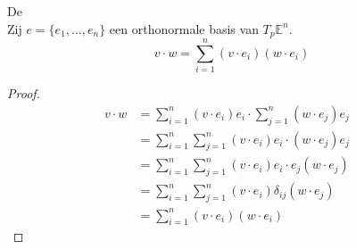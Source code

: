 \documentclass[main.tex]{subfiles}
\begin{document}
\begin{gev}
  \label{gev:identiteit-van-parseval}
  De \\
  Zij $e = \{e_{1},\dotsc,e_{n}\}$ een orthonormale basis van $T_{p}\mathbb{E}^{n}$. 
  \[ v \cdot w = \sum_{i=1}^{n}(v \cdot e_{i})(w \cdot e_{i})\]

  \begin{proof}
    \[
    \begin{array}{rll}

      v \cdot w &= \sum_{i=1}^{n} (v \cdot e_{i})e_{i} \cdot \sum_{j=1}^{n} (w \cdot e_{j})e_{j} &\\ 
                &= \sum_{i=1}^{n}\sum_{j=1}^{n}  (v \cdot e_{i})e_{i} \cdot (w \cdot e_{j})e_{j} &\\
                &= \sum_{i=1}^{n}\sum_{j=1}^{n}  (v \cdot e_{i})e_{i} \cdot e_{j}(w \cdot e_{j}) &\\
                &= \sum_{i=1}^{n}\sum_{j=1}^{n}  (v \cdot e_{i})\delta_{ij}(w \cdot e_{j}) &\\
                &= \sum_{i=1}^{n}(v \cdot e_{i})(w \cdot e_{i})
    \end{array}
    \]
  \end{proof}
\end{gev}
\end{document}
